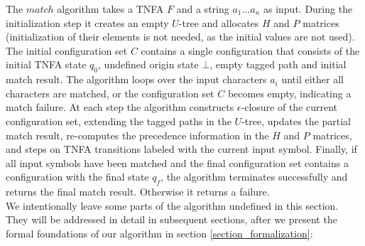 \documentclass[AMA,STIX1COL]{WileyNJD-v2}
\begin{document}
The $match$ algorithm takes a TNFA $F$ and a string $a_1 \hdots a_n$ as input.
%
During the initialization step it creates an empty $U$-tree and allocates $H$ and $P$ matrices
(initialization of their elements is not needed, as the initial values are not used).
The initial configuration set $C$ contains a single configuration
that consists of the initial TNFA state $q_0$, undefined origin state $\bot$, empty tagged path and initial match result.
%
The algorithm loops over the input characters $a_i$ until either all characters are matched,
or the configuration set $C$ becomes empty, indicating a match failure.
%
At each step the algorithm constructs $\epsilon$-closure of the current configuration set, extending the tagged paths in the $U$-tree,
updates the partial match result,
re-computes the precedence information in the $H$ and $P$ matrices,
and steps on TNFA transitions labeled with the current input symbol.
%
Finally, if all input symbols have been matched and the final configuration set contains a configuration with the final state $q_f$,
the algorithm terminates successfully and returns the final match result.
Otherwise it returns a failure.
\\

We intentionally leave some parts of the algorithm undefined in this section.
They will be addressed in detail in subsequent sections,
after we present the formal foundations of our algorithm in section \ref{section_formalization}:
\end{document}
